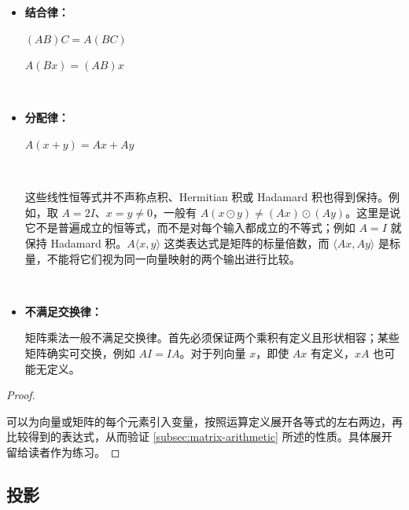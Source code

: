 \begin{tcolorbox}[title={\textbf{\tboxtheorem{\ref*{subsec:matrix-arithmetic}} 矩阵运算的性质}}]

\begin{itemize}

\item \textbf{结合律：}

$(AB)C = A(BC)$

$A(Bx) = (AB)x$


$ $

 
\item \textbf{分配律：}

$A(x + y) = Ax + Ay$




$ $

这些线性恒等式并不声称点积、Hermitian 积或 Hadamard 积也得到保持。例如，取 $A=2I$、$x=y\ne0$，一般有 $A(x\odot y)\ne(Ax)\odot(Ay)$。这里是说它不是普遍成立的恒等式，而不是对每个输入都成立的不等式；例如 $A=I$ 就保持 Hadamard 积。$A\langle x,y\rangle$ 这类表达式是矩阵的标量倍数，而 $\langle Ax,Ay\rangle$ 是标量，不能将它们视为同一向量映射的两个输出进行比较。

$ $

\item \textbf{不满足交换律：}

矩阵乘法一般不满足交换律。首先必须保证两个乘积有定义且形状相容；某些矩阵确实可交换，例如 $AI=IA$。对于列向量 $x$，即使 $Ax$ 有定义，$xA$ 也可能无定义。


\end{itemize}
\end{tcolorbox}

\begin{proof}

$ $

可以为向量或矩阵的每个元素引入变量，按照运算定义展开各等式的左右两边，再比较得到的表达式，从而验证 \ref*{subsec:matrix-arithmetic} 所述的性质。具体展开留给读者作为练习。

\end{proof}


\subsection{投影}
\label{subsec:projection}

